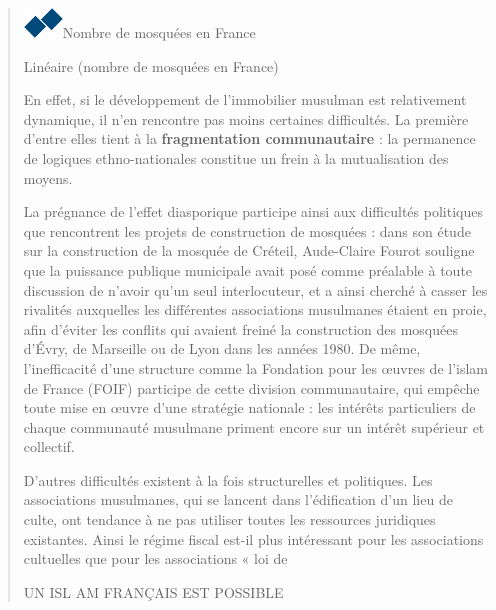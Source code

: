\begin{quote}
\includegraphics{ImageIslamFrance/media/image9.png}Nombre de mosquées en France

Linéaire (nombre de mosquées en France)

En effet, si le développement de l'immobilier musulman est relativement
dynamique, il n'en rencontre pas moins certaines difficultés. La
première d'entre elles tient à la \textbf{fragmentation communautaire} :
la permanence de logiques ethno-nationales constitue un frein à la
mutualisation des moyens.

La prégnance de l'effet diasporique participe ainsi aux difficultés
politiques que rencontrent les projets de construction de mosquées :
dans son étude sur la construction de la mosquée de Créteil, Aude-Claire
Fourot souligne que la puissance publique municipale avait posé comme
préalable à toute discussion de n'avoir qu'un seul interlocuteur, et a
ainsi cherché à casser les rivalités auxquelles les différentes
associations musulmanes étaient en proie, afin d'éviter les conflits qui
avaient freiné la construction des mosquées d'Évry, de Marseille ou de
Lyon dans les années 1980. De même, l'inefficacité d'une structure comme
la Fondation pour les œuvres de l'islam de France (FOIF) participe de
cette division communautaire, qui empêche toute mise en œuvre d'une
stratégie nationale : les intérêts particuliers de chaque communauté
musulmane priment encore sur un intérêt supérieur et collectif.

D'autres difficultés existent à la fois structurelles et politiques. Les
associations musulmanes, qui se lancent dans l'édification d'un lieu de
culte, ont tendance à ne pas utiliser toutes les ressources juridiques
existantes. Ainsi le régime fiscal est-il plus intéressant pour les
associations cultuelles que pour les associations « loi de

UN ISL AM FRANÇAIS EST POSSIBLE


\end{quote}

